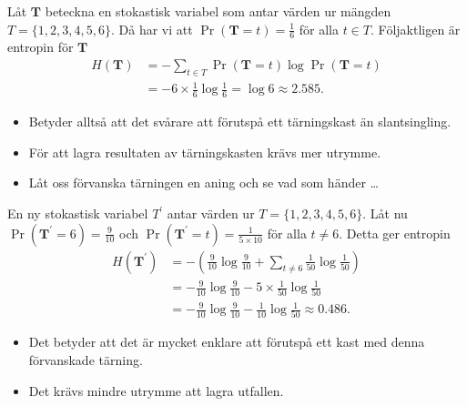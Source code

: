 \documentclass{beamer}
\let\stoch\mathbf{}
\begin{document}
\begin{frame}
  \begin{example}
    Låt \(\stoch T\) beteckna en stokastisk variabel som antar värden ur 
    mängden \(T = \{1, 2, 3, 4, 5, 6\}\).
    Då har vi att \(\Pr(\stoch T = t) = \frac{1}{6}\) för alla \(t\in T\).
    Följaktligen är entropin för \(\stoch T\)
    \begin{align*}
      H(\stoch T) &= -\sum_{t\in T} \Pr(\stoch T = t)\log\Pr(\stoch T = t) \\
      &= -6\times \frac{1}{6}\log\frac{1}{6} = \log 6 \approx 2.585.
    \end{align*}
  \end{example}
\end{frame}

\begin{frame}
  \begin{itemize}
    \item Betyder alltså att det svårare att förutspå ett tärningskast än 
      slantsingling.

    \item För att lagra resultaten av tärningskasten krävs mer utrymme.

    \item Låt oss förvanska tärningen en aning och se vad som händer \dots
  \end{itemize}
\end{frame}

\begin{frame}
  \begin{example}
    En ny stokastisk variabel \(T^\prime\) antar värden ur \(T = \{1, 2, 3, 4, 
    5, 6\}\).
    Låt nu \(\Pr(\stoch T^\prime = 6) = \frac{9}{10}\) och \(\Pr(\stoch 
    T^\prime = t) = \frac{1}{5\times 10}\) för alla \(t\neq 6\).
    Detta ger entropin
    \begin{align*}
      H(\stoch T^\prime) &= -\left( \frac{9}{10}\log\frac{9}{10} + \sum_{t\neq 
      6} \frac{1}{50}\log\frac{1}{50} \right) \\
        &= -\frac{9}{10}\log\frac{9}{10} -5\times\frac{1}{50}\log\frac{1}{50} 
        \\
        &= -\frac{9}{10}\log\frac{9}{10} -\frac{1}{10}\log\frac{1}{50} \approx 
        0.486.
    \end{align*}
  \end{example}
\end{frame}

\begin{frame}
  \begin{itemize}
    \item Det betyder att det är mycket enklare att förutspå ett kast med denna 
      förvanskade tärning.
    \item Det krävs mindre utrymme att lagra utfallen.
  \end{itemize}
\end{frame}
\end{document}
